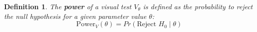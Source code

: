 \documentclass{article}
\newcommand{\red}[1]{{\color{red} #1}}
\newcommand{\green}[1]{{\color{green} #1}} %
\newtheorem{dfn}{Definition}[section]
\begin{document}










%
%
\begin{dfn} \label{dfn:power}
The \textbf{power} of a visual test $V_{\theta}$ is defined as the probability to reject the null hypothesis for a given parameter value $\theta$:
    \begin{equation*}
      \text{Power}_V(\theta)= Pr(\text{Reject } H_0 \mid \theta) 
    \end{equation*}
\end{dfn}
\end{document}
